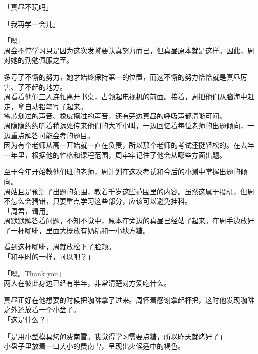 「真昼不玩吗」

「我再学一会儿」

「嗯」\\

周会不停学习只是因为这次发誓要认真努力而已，但真昼原本就是这样。因此，周对她的勤勉佩服之至。

多亏了不懈的努力，她才始终保持第一的位置，而这不懈的努力恰恰就是真昼厉害、了不起的地方。\\

周看着他们三人连忙离开书桌，占领起电视机的前面。接着，周把他们从脑海中赶走，拿自动铅笔写了起来。\\

笔芯划过的声音、橡皮擦过的声音，还有旁边真昼的呼吸声都清晰可闻。\\

周隐隐约约听着稍远处传来他们的大呼小叫，一边回忆着每位老师的出题倾向，一边重点解答可能会考的题目。\\

因为有个老师从高一开始就一直在负责，所以那个老师的考试还挺轻松的。在去年一年里，根据他的性格和课程范围，周牢牢记住了他会从哪些方面出题。

至于今年开始教他们班的老师，周计划在这次考试和今后的小测中掌握出题的倾向。\\

周姑且是预测了出题的范围，教着千岁这些范围里的内容。虽然这属于投机，但周不怎么会猜错，只要重点学习这些部分，应该可以避免挂科。\\

「周君，请用」\\

周默默解答着问题，不知不觉中，原本在旁边的真昼已经站了起来。在周手边放好了一杯咖啡，里面大概放有奶精和一小块方糖。

看到这杯咖啡，周就放松下了脸颊。\\

「和平时的一样，可以吧？」

「嗯。Thank you」\\

两人在彼此身边已经有半年，非常清楚对方爱吃什么。

真昼正好在他想要的时候把咖啡拿了过来。周怀着感谢拿起杯把，这时他发现咖啡之外还放着一个小盘子。\\

「这是什么？」

「是用小型模具烤的费南雪。我觉得学习需要点糖，所以昨天就烤好了」\\

小盘子里放着一口大小的费南雪，呈现出火候适中的褐色。\\

